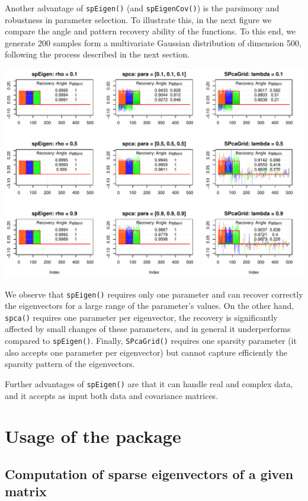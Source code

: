 \documentclass[]{article}
\begin{document}
Another advantage of \texttt{spEigen()} (and \texttt{spEigenCov()}) is
the parsimony and robustness in parameter selection. To illustrate this,
in the next figure we compare the angle and pattern recovery ability of
the functions. To this end, we generate 200 samples form a multivariate
Gaussian distribution of dimension 500, following the process described
in the next section.

\begin{center}\includegraphics[width=0.95\linewidth]{figures/recovery} \end{center}

We observe that \texttt{spEigen()} requires only one parameter and can
recover correctly the eigenvectors for a large range of the parameter's
values. On the other hand, \texttt{spca()} requires one parameter per
eigenvector, the recovery is significantly affected by small changes of
these parameters, and in general it underperforms compared to
\texttt{spEigen()}. Finally, \texttt{SPcaGrid()} requires one sparsity
parameter (it also accepts one parameter per eigenvector) but cannot
capture efficiently the sparsity pattern of the eigenvectors.

Further advantages of \texttt{spEigen()} are that it can handle real and
complex data, and it accepts as input both data and covariance matrices.

\section{Usage of the package}\label{usage-of-the-package}

\subsection{Computation of sparse eigenvectors of a given
matrix}\label{computation-of-sparse-eigenvectors-of-a-given-matrix}
\end{document}
